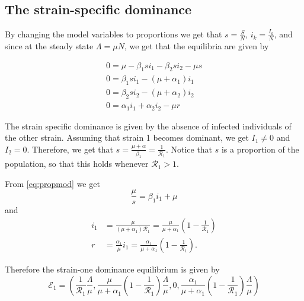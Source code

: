\documentclass{book}
\begin{document}
\subsection*{The strain-specific dominance}
By changing the model variables to proportions we get that $s=\frac{S}{N}$, $i_{k}=\frac{I_{k}}{N}$, and since at the steady state $\Lambda=\mu N$, we get that the equilibria are given by

\begin{equation} \label{eq:propmod}
\begin{array}{l}
0=\mu-\beta_{1} s i_{1}-\beta_{2} s i_{2}-\mu s \\
0=\beta_{1} s i_{1}-\left(\mu+\alpha_{1}\right) i_{1} \\
0=\beta_{2} s i_{2}-\left(\mu+\alpha_{2}\right) i_{2} \\
0=\alpha_{1} i_{1}+\alpha_{2} i_{2}-\mu r
\end{array}
\end{equation}

The strain specific dominance is given by the absence of infected individuals of the other strain. Assuming that strain 1 becomes dominant, we get $I_1\neq 0$ and $I_2=0$. Therefore, we get that $s=\frac{\mu+\alpha}{\beta_1}=\frac{1}{\mathcal{R}_1}$. Notice that $s$ is a proportion of the population, so that this holds whenever $\mathcal{R}_1>1$.

From \eqref{eq:propmod} we get 
\begin{equation}
\frac{\mu}{s}=\beta_{1} i_{1}+\mu
\end{equation}
and
\begin{equation}
\begin{aligned}
i_{1} &=\frac{\mu}{\left(\mu+\alpha_{1}\right) \mathscr{R}_{1}}=\frac{\mu}{\mu+\alpha_{1}}\left(1-\frac{1}{\mathscr{R}_{1}}\right) \\
r &=\frac{\alpha_{1}}{\mu} i_{1}=\frac{\alpha_{1}}{\mu+\alpha_{1}}\left(1-\frac{1}{\mathscr{R}_{1}}\right).
\end{aligned}
\end{equation}

Therefore the strain-one dominance equilibrium is given by
\begin{equation}
\mathscr{E}_{1}=\left(\frac{1}{\mathscr{R}_{1}} \frac{\Lambda}{\mu}, \frac{\mu}{\mu+\alpha_{1}}\left(1-\frac{1}{\mathscr{R}_{1}}\right) \frac{\Lambda}{\mu}, 0, \frac{\alpha_{1}}{\mu+\alpha_{1}}\left(1-\frac{1}{\mathscr{R}_{1}}\right) \frac{\Lambda}{\mu}\right)
\end{equation}
\end{document}
